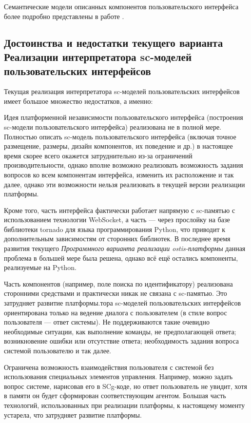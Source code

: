 Семантические модели описанных компонентов пользовательского интерфейса более подробно представлены в работе .

\subsection{Достоинства и недостатки текущего варианта Реализации интерпретатора sc-моделей пользовательских интерфейсов}
\label{sec_soft_platform_sci_machine_problems}

Текущая реализация интерпретатора sc-моделей пользовательских интерфейсов имеет большое множество недостатков, а именно:
\begin{textitemize}
	\item Идея платформенной независимости пользовательского интерфейса (построения sc-модели пользовательского интерфейса) реализована не в полной мере. Полностью описать sc-модель пользовательского интерфейса (включая точное размещение, размеры, дизайн компонентов, их поведение и др.) в настоящее время скорее всего окажется затруднительно из-за ограничений производительности, однако вполне возможно реализовать возможность задания вопросов ко всем компонентам интерфейса, изменить их расположение и так далее, однако эти возможности нельзя реализовать в текущей версии реализации платформы.
	\item Кроме того, часть интерфейса фактически работает напрямую с sc-памятью с использованием технологии WebSocket, а часть --- через прослойку на базе библиотеки tornado для языка программирования Python, что приводит к дополнительным зависимостям от сторонних библиотек. В последнее время развития текущего \textit{Программного варианта реализации ostis-платформы} данная проблема в большей мере была решена, однако всё ещё остались компоненты, реализуемые на Python.
	\item Часть компонентов (например, поле поиска по идентификатору) реализована сторонними средствами и практически никак не связана с sc-памятью. Это затрудняет развитие платформы.тора sc-моделей пользовательских интерфейсов ориентирована только на ведение диалога с пользователем (в стиле вопрос пользователя --- ответ системы). Не поддерживаются такие очевидно необходимые ситуации, как выполнение команды, не предполагающей ответа; возникновение ошибки или отсутствие ответа; необходимость задания вопроса системой пользователю и так далее.
	\item Ограничена возможность взаимодействия пользователя с системой без использования специальных элементов управления. Например, можно задать вопрос системе, нарисовав его в SCg-коде, но ответ пользователь не увидит, хотя в памяти он будет сформирован соответствующим агентом. Большая часть технологий, использованных при реализации платформы, к настоящему моменту устарела, что затрудняет развитие платформы.

\end{textitemize}
